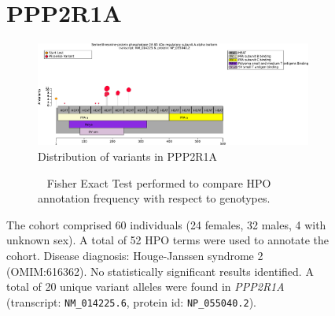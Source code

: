 \begin{figure}[htbp]
\section*{PPP2R1A}
\centering
\begin{subfigure}[b]{0.95\textwidth}
\centering
\includegraphics[width=\textwidth]{ img/PPP2R1A_protein_diagram.pdf} 
\captionsetup{justification=raggedright,singlelinecheck=false}
\caption{Distribution of variants in PPP2R1A}
\end{subfigure}

\vspace{2em}

\begin{subfigure}[b]{0.95\textwidth}
\centering
{}
\captionsetup{justification=raggedright,singlelinecheck=false}
\caption{             Fisher Exact Test performed to compare HPO annotation frequency with respect to genotypes. }
\end{subfigure}

\vspace{2em}

\caption{ The cohort comprised 60 individuals (24 females, 32 males, 4 with unknown sex). A total of 52 HPO terms were used to annotate the cohort. Disease diagnosis: Houge-Janssen syndrome 2 (OMIM:616362). No statistically significant results identified. A total of 20 unique variant alleles were found in \textit{PPP2R1A} (transcript: \texttt{NM\_014225.6}, protein id: \texttt{NP\_055040.2}).}
\end{figure}
